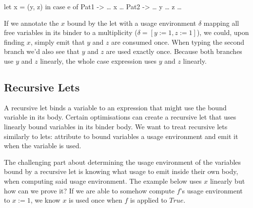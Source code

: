 \documentclass[a4paper, draft]{report}
\begin{document}
\begin{code}
let x = (y, z) in
case e of
  Pat1 -> … x …
  Pat2 -> … y … z …
\end{code}

If we annotate the $x$ bound by the let with a usage environment $\delta$
mapping all free variables in its binder to a multiplicity ($\delta = [y := 1, z
:= 1]$), we could, upon finding $x$, simply emit that $y$ and $z$ are consumed
once. When typing the second branch we'd also see that $y$ and $z$ are used
exactly once. Because both branches use $y$ and $z$ linearly, the whole case
expression uses $y$ and $z$ linearly.





\subsection{Recursive Lets}

A recursive let binds a variable to an expression that might use the bound
variable in its body. Certain optimisations can create a recursive let that uses
linearly bound variables in its binder body. We want to treat recursive lets
similarly to lets: attribute to bound variables a usage environment and emit it
when the variable is used.

The challenging part about determining the usage environment of the variables bound
by a recursive let is knowing what usage to emit inside their own body, when
computing said usage environment. The example below uses $x$ linearly %
but how can we prove it? If we are able to somehow compute $f$'s usage
environment to $x := 1$, we know $x$ is used once when $f$ is applied to
$\mathit{True}$.
\end{document}
